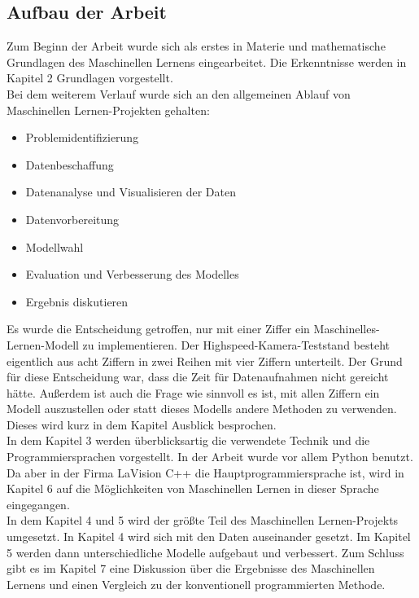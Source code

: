 \subsection{Aufbau der Arbeit}
Zum Beginn der Arbeit wurde sich als erstes in Materie und mathematische Grundlagen des Maschinellen Lernens eingearbeitet. Die Erkenntnisse werden in Kapitel 2 Grundlagen vorgestellt. \\
Bei dem weiterem Verlauf wurde sich an den allgemeinen Ablauf von Maschinellen Lernen-Projekten gehalten\cite{Geron2019}: \\
\begin{itemize} \label{Auflistung Projekt Ablauf}
\item Problemidentifizierung
\item Datenbeschaffung
\item Datenanalyse und Visualisieren der Daten
\item Datenvorbereitung 
\item Modellwahl
\item Evaluation und Verbesserung des Modelles
\item Ergebnis diskutieren
\end{itemize} 
Es wurde die Entscheidung getroffen, nur mit einer Ziffer ein Maschinelles-Lernen-Modell zu implementieren. Der Highspeed-Kamera-Teststand besteht eigentlich aus acht Ziffern in zwei Reihen mit vier Ziffern unterteilt.  Der Grund für diese Entscheidung war,  dass die Zeit für Datenaufnahmen nicht gereicht hätte.  Außerdem ist auch die Frage wie sinnvoll es ist, mit allen Ziffern ein Modell auszustellen oder statt dieses Modells andere Methoden zu verwenden.  Dieses wird kurz in dem Kapitel Ausblick besprochen.\\
In dem Kapitel 3 werden überblicksartig die verwendete Technik und die Programmiersprachen vorgestellt. In der Arbeit wurde vor allem Python benutzt.  Da aber in der Firma LaVision C++  die Hauptprogrammiersprache ist,  wird in Kapitel 6 auf die Möglichkeiten von Maschinellen Lernen in dieser Sprache eingegangen.\\
In dem Kapitel 4 und 5 wird der größte Teil des Maschinellen Lernen-Projekts umgesetzt.  In Kapitel 4 wird sich mit den Daten auseinander gesetzt.  Im Kapitel 5 werden dann unterschiedliche Modelle aufgebaut und verbessert.
Zum Schluss gibt es im Kapitel 7 eine Diskussion über die Ergebnisse des Maschinellen Lernens und einen Vergleich zu der konventionell programmierten Methode.
